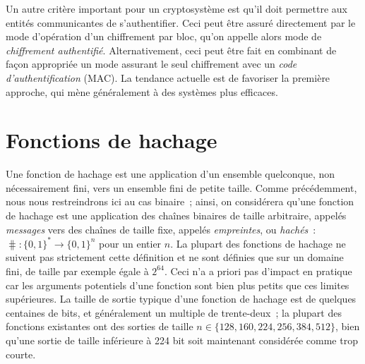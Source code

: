Un autre critère important pour un cryptosystème est qu'il
doit permettre aux entités communicantes de s'authentifier. Ceci peut être assuré directement
par le mode d'opération d'un chiffrement par bloc, qu'on appelle alors mode de \emph{chiffrement authentifié}. Alternativement, ceci
peut être fait en combinant de façon appropriée un mode assurant le seul chiffrement avec
un \emph{code d'authentification} (MAC).
La tendance actuelle est de favoriser la première approche, qui mène généralement à des systèmes plus efficaces.





\section{Fonctions de hachage}

Une fonction de hachage est une application d'un ensemble quelconque, non nécessairement fini, vers un ensemble fini de petite taille.
Comme précédemment, nous nous restreindrons ici au cas binaire~; ainsi, on considérera qu'une
fonction de hachage  est une application des chaînes binaires de taille arbitraire, appelés \emph{messages} vers des chaînes de taille
fixe, appelés \emph{empreintes}, ou \emph{hachés}~:
$\hash : \{0,1\}^* \rightarrow \{0,1\}^n$ pour un entier $n$.
La plupart des fonctions de hachage ne suivent pas strictement cette définition et ne sont définies que sur un domaine fini, de taille par exemple égale
à $2^{64}$. Ceci n'a a priori pas d'impact en pratique car les arguments potentiels d'une fonction sont bien plus petits que ces
limites supérieures. %
La taille de sortie typique d'une fonction de hachage est de quelques centaines de bits, et généralement un multiple de trente-deux~; la plupart
des fonctions existantes ont des sorties de taille
$n \in \{128, 160, 224, 256, 384, 512\}$, bien qu'une sortie de taille inférieure à 224 bit soit maintenant considérée comme trop courte. 

